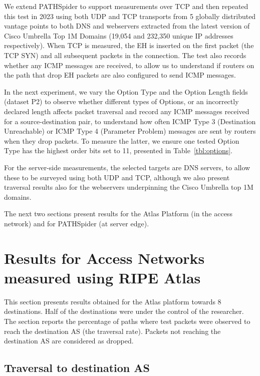 \documentclass[conference]{IEEEtran}
\begin{document}
We extend PATHSpider to support measurements over TCP and then repeated this test in 2023 using both UDP and TCP transports from 5 globally distributed vantage points to both DNS and webservers extracted from the latest version of Cisco Umbrella Top 1M Domains (19,054 and 232,350 unique IP addresses respectively). When TCP is measured, the EH is inserted on the first packet (the TCP SYN) and all subsequent packets in the connection.
The test also records whether any ICMP messages are received, to allow us to understand if routers on the path that drop EH packets are also configured to send ICMP messages.

In the next experiment, we vary the Option Type and the Option Length fields (dataset P2) to observe whether different types of Options, or an incorrectly declared length affects packet traversal and record any ICMP messages received
for a source-destination pair, to understand how often ICMP Type 3 (Destination Unreachable) or ICMP Type 4 (Parameter Problem) messages are sent by routers when they drop packets. To measure the latter, we ensure one tested Option Type has the highest order bits set to 11, presented in Table~\ref{tbl:options}.

For the server-side measurements, the selected targets are DNS servers, to allow these to be surveyed using both UDP and TCP, although we also present traversal results also for the webservers underpinning the Cisco Umbrella top 1M domains.

The next two sections present results for the Atlas Platform  (in the access network) and for PATHSpider (at server edge).

\section{Results for Access Networks measured using RIPE Atlas} 
\label{sec:ripe-results}

This section presents results obtained for the Atlas platform towards 8 destinations. Half of the destinations were under the control of the researcher. The section reports the percentage of paths where test packets were observed to reach the destination AS (the traversal rate). Packets not reaching the destination AS are considered as dropped. 

\subsection{Traversal to destination AS}
\end{document}
